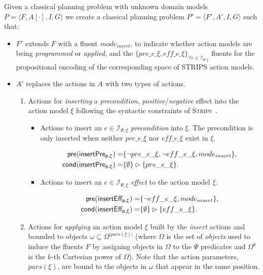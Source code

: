 \documentclass{article}
\newcommand{\tup}[1]{{\langle #1 \rangle}}
\newcommand{\pre}{\mathsf{pre}}     %
\newcommand{\cond}{\mathsf{cond}}   %
\newcommand{\strips}{\textsc{Strips}}
\begin{document}
Given a classical planning problem with unknown domain models $P=\tup{F,A[\cdot],I,G}$ we create a classical planning problem $P'=\tup{F',A',I,G}$ such that:
\begin{itemize}
\item $F'$ extends $F$ with a fluent $mode_{insert}$, to indicate whether action models are being {\em programmed} or {\em applied}, and the $\{pre\_e\_\xi, eff\_e\_\xi\}_{\forall e\in{\mathcal I}_{\Psi,\xi}}$ fluents for the propositional encoding of the corresponding space of STRIPS action models. 

\item $A'$ replaces the actions in $A$ with two types of actions.
\begin{enumerate}
\item Actions for {\em inserting} a {\em precondition}, {\em positive}/{\em negative} effect into the action model $\xi$ following the syntactic constraints of \strips\ . 
\begin{itemize}
\item Actions to insert an $e\in{\mathcal I}_{\Psi,\xi}$ {\em precondition} into $\xi$. The precondition is only inserted when neither $pre\_e\_\xi$ nor $eff\_e\_\xi$ exist in $\xi$.

\begin{small}
\begin{align*}
\hspace*{7pt}\pre(\mathsf{insertPre_{p,\xi}})=&\{\neg pre\_e\_\xi, \neg eff\_e\_\xi, mode_{insert}\},\\
\cond(\mathsf{insertPre_{p,\xi}})=&\{\emptyset\}\rhd\{pre\_e\_\xi\}.
\end{align*}
\end{small}

\item Actions to insert an $e\in{\mathcal I}_{\Psi,\xi}$ {\em effect} to the action model $\xi$. 

\begin{small}
\begin{align*}
\hspace*{7pt}\pre(\mathsf{insertEff_{p,\xi}})=&\{\neg eff\_e\_\xi, mode_{insert}\},\\
\cond(\mathsf{insertEff_{p,\xi}})=&\{\emptyset\}\rhd\{eff\_e\_\xi\}.
\end{align*}
\end{small}
\end{itemize}

\item Actions for {\em applying} an action model $\xi$ built by the {\em insert} actions and bounded to objects $\omega\subseteq\Omega^{|pars(\xi)|}$ (where $\Omega$ is the set of {\em objects} used to induce the fluents $F$ by assigning objects in $\Omega$ to the $\Psi$ predicates and $\Omega^k$ is the $k$-th Cartesian power of $\Omega$). Note that the action parameters, $pars(\xi)$, are bound to the objects in $\omega$ that appear in the same position.
\end{enumerate}
\end{itemize}
\end{document}
